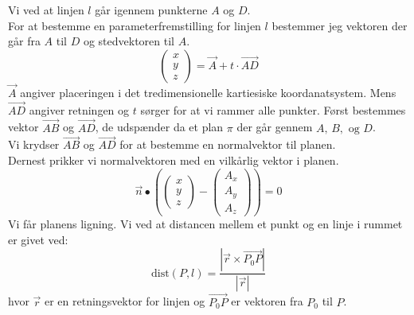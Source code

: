\begin{tcolorbox}[title=Opgave 2,
    colback=blue!1!white,
    colframe=black,
    colbacktitle=blue!25!white,
    coltitle=red!25!black,
    fonttitle=\bfseries,
    subtitle style={boxrule=0.4pt,
    colback=blue!7!white} ]
        Vi ved at linjen \(l\) går igennem punkterne \(A\) og \(D\).\\
        For at bestemme en parameterfremstilling for linjen \(l\) bestemmer jeg vektoren der går fra \(A\) til \(D\) og stedvektoren til \(A\).\\
        \[\begin{pmatrix} x\\y\\z \end{pmatrix}=\overrightarrow{A}+t\cdot \overrightarrow{AD}\]
        \(\overrightarrow{A}\) angiver placeringen i det tredimensionelle kartiesiske koordanatsystem. Mens \(\overrightarrow{AD}\) angiver retningen og \(t\) sørger for at vi rammer alle punkter.
        Først bestemmes vektor \(\overrightarrow{AB}\) og \(\overrightarrow{AD}\), de udspænder da et plan \(\pi\) der går gennem \(A,\, B,\text{ og } D\).\\
        Vi krydser \(\overrightarrow{AB}\) og \(\overrightarrow{AD}\) for at bestemme en normalvektor til planen.\\
        Dernest prikker vi normalvektoren med en vilkårlig vektor i planen.
        \[\overrightarrow{n}\bullet \left(\begin{pmatrix} x \\ y \\ z \end{pmatrix}-\begin{pmatrix}A_x \\A_y\\A_z \end{pmatrix}\right)=0\]
        Vi får planens ligning.
        Vi ved at distancen mellem et punkt og en linje i rummet er givet ved:
        \[\text{dist}(P,l)=\frac{\left| \overrightarrow{r} \times \overrightarrow{P_0 P}\right|}{\left|\overrightarrow{r} \right|}\]
        hvor \(\overrightarrow{r}\) er en retningsvektor for linjen og \(\overrightarrow{P_0 P}\) er vektoren fra \(P_0\) til \(P\).
\end{tcolorbox}